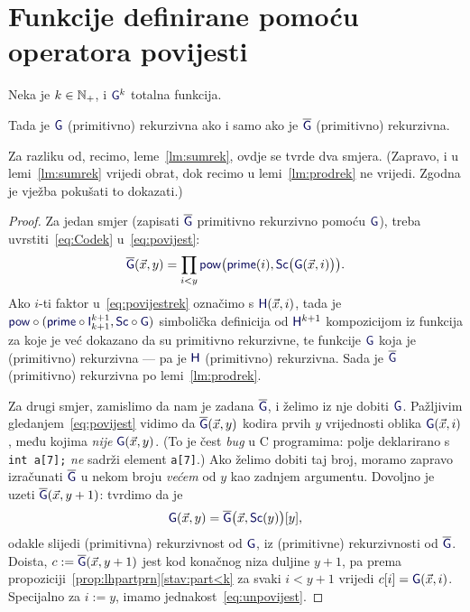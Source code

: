 \section{Funkcije definirane pomoću operatora povijesti}

\begin{lema}\label{lm:povijestrek}
Neka je $k\in{\mathbb N}_+$, i $\f{G}^k$ totalna funkcija.

Tada je ${\f G}$ (primitivno) rekurzivna ako i samo ako je $\overline{\f G}$ (primitivno) rekurzivna.
\end{lema}

Za razliku od, recimo, leme~\ref{lm:sumrek}, ovdje se tvrde dva smjera. (Zapravo, i u lemi~\ref{lm:sumrek} vrijedi obrat, dok recimo u lemi~\ref{lm:prodrek} ne vrijedi. Zgodna je vježba pokušati to dokazati.)
\begin{proof}
Za jedan smjer (zapisati $\overline{\f G}$ primitivno rekurzivno pomoću $\f G$), treba uvrstiti~\eqref{eq:Codek} u~\eqref{eq:povijest}:
\begin{equation}\label{eq:povijestrek}
    \overline{\f G}(\vec x,y)=\prod_{i<y}\f{pow}\bigl(\f{prime}(i),\f{Sc}\bigl(\f{G}(\vec x,i)\bigr)\bigr)\text.
\end{equation}
Ako $i$-ti faktor u~\eqref{eq:povijestrek} označimo s $\f H(\vec x,i)$, tada je $\f{pow}\circ(\f{prime}\circ\f I_{k+1}^{k+1},\f{Sc}\circ\f G)$ sim\-bo\-li\-čka definicija od $\f H^{k+1}$ kompozicijom iz funkcija za koje je već dokazano da su primitivno rekurzivne, te funkcije $\f G$ koja je (primitivno) rekurzivna --- pa je $\f H$ (primitivno) rekurzivna. Sada je $\overline{\f G}$ (primitivno) rekurzivna po lemi~\ref{lm:prodrek}.

Za drugi smjer, zamislimo da nam je zadana $\overline{\f G}$, i želimo iz nje dobiti $\f G$. Pažljivim gledanjem~\eqref{eq:povijest} vidimo da $\overline{\f G}(\vec x,y)$ kodira prvih $y$ vrijednosti oblika $\f G(\vec x,i)$, među kojima \emph{nije} $\f G(\vec x,y)$. (To je čest \emph{bug} u C programima: polje deklarirano s \texttt{int a[7];} \emph{ne} sadrži element \texttt{a[7]}.) Ako želimo dobiti taj broj, moramo zapravo izračunati $\overline{\f G}$ u nekom broju \emph{većem} od $y$ kao zadnjem argumentu. Dovoljno je uzeti $\overline{\f G}(\vec x,y+1)$: tvrdimo da je
\begin{equation}\label{eq:unpovijest}
    \f G(\vec x,y)=\overline{\f G}\bigl(\vec x,\f{Sc}(y)\bigr)[y]\text,
\end{equation}
odakle slijedi (primitivna) rekurzivnost od $\f G$, iz (primitivne) rekurzivnosti od $\overline{\f G}$. Doista, $c:=\overline{\f G}(\vec x,y+1)$ jest kod konačnog niza duljine $y+1$, pa prema propoziciji~\ref{prop:lhpartprn}\eqref{stav:part<k} za svaki $i<y+1$ vrijedi $c[i]=\f G(\vec x,i)$. Specijalno za $i:=y$, imamo jednakost~\eqref{eq:unpovijest}.
\end{proof}

